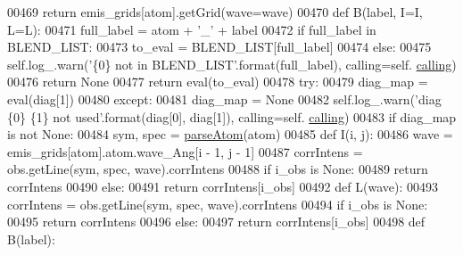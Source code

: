 \begin{DoxyCode}
00469                 \textcolor{keywordflow}{return} emis\_grids[atom].getGrid(wave=wave)
00470             \textcolor{keyword}{def }B(label, I=I, L=L):
00471                 full\_label = atom + \textcolor{stringliteral}{'\_'} + label
00472                 \textcolor{keywordflow}{if} full\_label \textcolor{keywordflow}{in} BLEND\_LIST:
00473                     to\_eval = BLEND\_LIST[full\_label]
00474                 \textcolor{keywordflow}{else}:
00475                     self.log\_.warn(\textcolor{stringliteral}{'\{0\} not in BLEND\_LIST'}.format(full\_label), calling=self.
      \hyperlink{classpyneb_1_1core_1_1diags_1_1_diagnostics_a07dce673fec8b2383ef411ab94b0b2fe}{calling})
00476                     \textcolor{keywordflow}{return} \textcolor{keywordtype}{None}
00477                 \textcolor{keywordflow}{return} eval(to\_eval)
00478             \textcolor{keywordflow}{try}:
00479                 diag\_map = eval(diag[1])
00480             \textcolor{keywordflow}{except}:
00481                 diag\_map = \textcolor{keywordtype}{None}
00482                 self.log\_.warn(\textcolor{stringliteral}{'diag \{0\} \{1\} not used'}.format(diag[0], diag[1]), calling=self.
      \hyperlink{classpyneb_1_1core_1_1diags_1_1_diagnostics_a07dce673fec8b2383ef411ab94b0b2fe}{calling})
00483             \textcolor{keywordflow}{if} diag\_map \textcolor{keywordflow}{is} \textcolor{keywordflow}{not} \textcolor{keywordtype}{None}:
00484                 sym, spec = \hyperlink{namespacepyneb_1_1utils_1_1misc_a8c069186002a3e73dd474958e35034d5}{parseAtom}(atom)
00485                 \textcolor{keyword}{def }I(i, j):
00486                     wave = emis\_grids[atom].atom.wave\_Ang[i - 1, j - 1]
00487                     corrIntens = obs.getLine(sym, spec, wave).corrIntens
00488                     \textcolor{keywordflow}{if} i\_obs \textcolor{keywordflow}{is} \textcolor{keywordtype}{None}:
00489                         \textcolor{keywordflow}{return} corrIntens
00490                     \textcolor{keywordflow}{else}:
00491                         \textcolor{keywordflow}{return} corrIntens[i\_obs]
00492                 \textcolor{keyword}{def }L(wave):
00493                     corrIntens = obs.getLine(sym, spec, wave).corrIntens
00494                     \textcolor{keywordflow}{if} i\_obs \textcolor{keywordflow}{is} \textcolor{keywordtype}{None}:
00495                         \textcolor{keywordflow}{return} corrIntens
00496                     \textcolor{keywordflow}{else}:
00497                         \textcolor{keywordflow}{return} corrIntens[i\_obs]
00498                 \textcolor{keyword}{def }B(label):

\end{DoxyCode}
